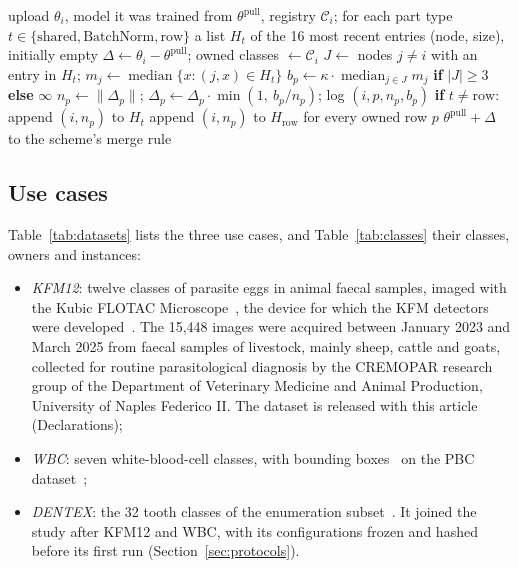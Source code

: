 \documentclass[pdflatex,sn-mathphys-num]{sn-jnl}
\begin{document}
\begin{algorithm}[t]
\caption{Ownership-aware screening of one upload from node $i$}\label{alg:ora}
\begin{algorithmic}[1]
\Require upload $\theta_i$, model it was trained from $\theta^{\text{pull}}$, registry $\mathcal{C}_i$; for each part type $t\in\{\text{shared},\text{BatchNorm},\text{row}\}$ a list $H_t$ of the 16 most recent entries (node, size), initially empty
\State $\Delta \gets \theta_i-\theta^{\text{pull}}$; \quad owned classes $\gets \mathcal{C}_i$ 
  \State $J \gets$ nodes $j\neq i$ with an entry in $H_t$; \quad $m_j \gets \operatorname{median}\{x:(j,x)\in H_t\}$
  \State $b_p \gets \kappa\cdot\operatorname{median}_{j\in J} m_j$ \textbf{if} $|J|\ge 3$ \textbf{else} $\infty$
  \State $n_p \gets \lVert\Delta_p\rVert$; \quad $\Delta_p \gets \Delta_p\cdot\min\!\left(1,\ b_p/n_p\right)$; \quad log $(i,p,n_p,b_p)$
  \State \textbf{if} $t\neq\text{row}$: append $(i,n_p)$ to $H_t$
\EndFor
\State append $(i,n_p)$ to $H_{\text{row}}$ for every owned row $p$ 
\State \Return $\theta^{\text{pull}}+\Delta$ to the scheme's merge rule
\end{algorithmic}
\end{algorithm}

\subsection{Use cases}\label{sec:usecases}
Table~\ref{tab:datasets} lists the three use cases, and Table~\ref{tab:classes} their classes, owners and instances:
\begin{itemize}
\item \emph{KFM12}: twelve classes of parasite eggs in animal faecal samples, imaged with the Kubic FLOTAC Microscope~\cite{cringoli2021kfm}, the device for which the KFM detectors were developed~\cite{capuozzo2024aikfm,capuozzo2026ijp}. The 15,448 images were acquired between January 2023 and March 2025 from faecal samples of livestock, mainly sheep, cattle and goats, collected for routine parasitological diagnosis by the CREMOPAR research group of the Department of Veterinary Medicine and Animal Production, University of Naples Federico II. The dataset is released with this article (Declarations);
\item \emph{WBC}: seven white-blood-cell classes, with bounding boxes~\cite{wbcdetection} on the PBC dataset~\cite{acevedo2020pbc};
\item \emph{DENTEX}: the 32 tooth classes of the enumeration subset~\cite{hamamci2023dentex}. It joined the study after KFM12 and WBC, with its configurations frozen and hashed before its first run (Section~\ref{sec:protocols}).
\end{itemize}
\end{document}
